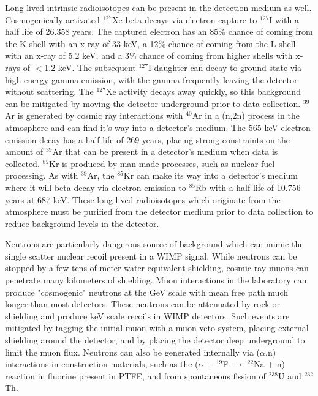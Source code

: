 \documentclass[a4paper,12pt]{article}
\begin{document}
Long lived intrinsic radioisotopes can be present in the detection medium as well.  Cosmogenically activated $^{127}$Xe beta decays via electron capture to $^{127}$I with a half life of 26.358 years.  The captured electron has an 85\% chance of coming from the K shell with an x-ray of 33 keV, a 12\% chance of coming from the L shell with an x-ray of 5.2 keV, and a 3\% chance of coming from higher shells with x-rays of $<$1.2 keV. The subsequent $^{127}$I daughter can decay to ground state via high energy gamma emission, with the gamma frequently leaving the detector without scattering. The $^{127}$Xe activity decays away quickly, so this background can be mitigated by moving the detector underground prior to data collection. $^{39}$Ar is generated by cosmic ray interactions with $^{40}$Ar in a (n,2n) process in the atmosphere and can find it's way into a detector's medium.  The 565 keV electron emission decay has a half life of 269 years, placing strong constraints on the amount of $^{39}$Ar that can be present in a detector's medium when data is collected. $^{85}$Kr is produced by man made processes, such as nuclear fuel processing.  As with $^{39}$Ar, the $^{85}$Kr can make its way into a detector's medium where it will beta decay via electron emission to $^{85}$Rb with a half life of 10.756 years at 687 keV.  These long lived radioisotopes which originate from the atmosphere must be purified from the detector medium prior to data collection to reduce background levels in the detector. \cite{PauloThesis}

Neutrons are particularly dangerous source of background which can mimic the single scatter nuclear recoil present in a WIMP signal.  While neutrons can be stopped by a few tens of meter water equivalent shielding, cosmic ray muons can penetrate many kilometers of shielding.  Muon interactions in the laboratory can produce "cosmogenic" neutrons at the GeV scale with mean free path much longer than most detectors.  These neutrons can be attenuated by rock or shielding and produce keV scale recoils in WIMP detectors.   Such events are mitigated by tagging the initial muon with a muon veto system, placing external shielding around the detector, and by placing the detector deep underground to limit the muon flux.  Neutrons can also be generated internally via ($\alpha$,n) interactions in construction materials, such as the ($\alpha$ + $^{19}$F $\rightarrow$ $^{22}$Na + n) reaction in fluorine present in PTFE, and from spontaneous fission of $^{238}$U and $^{232}$Th.  
\end{document}
